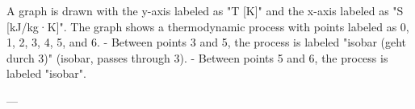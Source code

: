 A graph is drawn with the y-axis labeled as "T [K]" and the x-axis labeled as "S [kJ/kg·K]". The graph shows a thermodynamic process with points labeled as 0, 1, 2, 3, 4, 5, and 6.  
- Between points 3 and 5, the process is labeled "isobar (geht durch 3)" (isobar, passes through 3).  
- Between points 5 and 6, the process is labeled "isobar".  

---